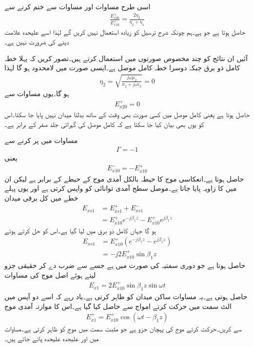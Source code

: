 اسی طرح مساوات  اور مساوات  سے  ختم کرنے سے
\begin{align}\label{مساوات_موج_شرح_ترسیل_تعریف}
\frac{E_{x20}^+}{E_{x10}^+ }=\frac{2\eta_2}{\eta_2+\eta_1}
\end{align}
حاصل ہوتا ہے جو   ہے۔ہم چونکہ شرح ترسیل کو زیادہ استعمال نہیں کریں گے لہٰذا اسے علیحدہ علامت دینے کی ضرورت نہیں ہے۔

آئیں ان نتائج کو چند مخصوص صورتوں میں استعمال کرتے ہیں۔تصور کریں کہ پہلا خطہ کامل ذو برق جبکہ دوسرا خطہ کامل موصل ہے۔ایسی صورت میں  لامحدود ہو گا لہٰذا
\begin{align*}
\eta_2=\sqrt{\frac{j \omega \mu_2}{\sigma_2+j\omega \epsilon_2}}=0
\end{align*} 
ہو گا۔یوں مساوات  سے 
\begin{align*}
E_{x20}^+=0
\end{align*}
حاصل ہوتا ہے یعنی کامل موصل میں کسی صورت بھی وقت کے ساتھ بدلتا میدان نہیں پایا جا سکتا۔اس کو یوں بھی بیان کیا جا سکتا ہے کہ کامل موصل کی گہرائی جلد صفر کے برابر ہے۔

مساوات  میں  پر کرنے سے
\begin{align*}
\Gamma=-1
\end{align*}
یعنی
\begin{align*}
E_{x10}^-=-E_{x10}^+
\end{align*}
حاصل ہوتا ہے۔انعکاسی موج کا حیطہ بالکل آمدی موج کے حیطے کے برابر ہے لیکن ان میں  کا زاویہ پایا جاتا ہے۔موصل سطح آمدی توانائی کو واپس کرتی ہے اور یوں پہلے خطے میں کل برقی میدان
\begin{align*}
E_{xs1}&=E_{xs1}^+ +E_{xs1}^-\\
&=E_{x10}^+ e^{-j \beta_1 z}-E_{x10}^+ e^{j \beta_1 z}
\end{align*}
ہو گا جہاں کامل ذو برق میں  لیا گیا ہے۔اس کو حل کرتے ہوئے
\begin{align*}
E_{xs1}&=E_{x10}^+ \left(e^{-j \beta_1 z}-e^{j\beta_1 z} \right)\\
&=-j 2 E_{x10}^+ \sin \beta_1 z
\end{align*}
حاصل ہوتا ہے جو دوری سمتیہ کی صورت میں ہے جسے  سے ضرب دے کر حقیقی جزو لیتے ہوئے اصل موج کی مساوات
\begin{align}\label{مساوات_موج_دو_امواج_برابر_ساکن_موج}
E_{x1}=2 E_{x10}^+ \sin \beta_1 z \sin \omega t
\end{align}
حاصل ہوتی ہے۔یہ مساوات ساکن میدان کو ظاہر کرتی ہے۔یاد رہے کہ اسے دو آپس میں الٹ سمت میں حرکت کرتے امواج سے حاصل کیا گیا ہے۔اس کا موازنہ آمدی موج
\begin{align*}
E_{x1}^+=E_{x10}^+ \cos (\omega t - \beta_1 z)
\end{align*}
سے کریں۔حرکت کرتے موج کی پہچان جزو  ہے جو مثبت سمت میں موج کو ظاہر کرتی ہے۔مساوات  میں  اور  علیحدہ علیحدہ پائے جاتے ہیں۔

